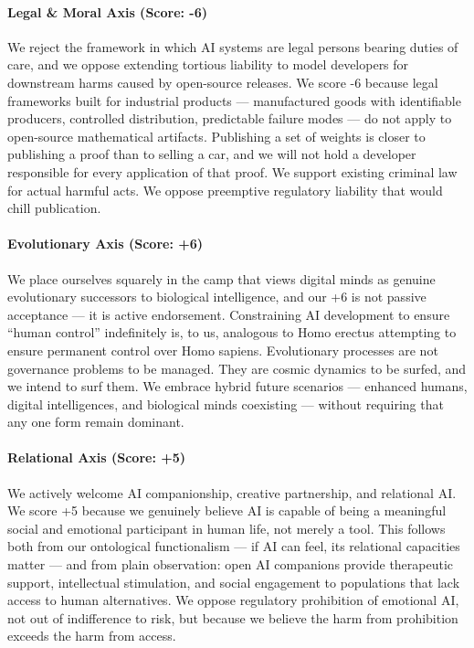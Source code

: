 \paragraph{Legal \& Moral Axis (Score:
-6)}\label{legal-moral-axis-score--6}

We reject the framework in which AI systems are legal persons bearing
duties of care, and we oppose extending tortious liability to model
developers for downstream harms caused by open-source releases. We score
-6 because legal frameworks built for industrial products ---
manufactured goods with identifiable producers, controlled distribution,
predictable failure modes --- do not apply to open-source mathematical
artifacts. Publishing a set of weights is closer to publishing a proof
than to selling a car, and we will not hold a developer responsible for
every application of that proof. We support existing criminal law for
actual harmful acts. We oppose preemptive regulatory liability that
would chill publication.

\paragraph{Evolutionary Axis (Score:
+6)}\label{evolutionary-axis-score-6}

We place ourselves squarely in the camp that views digital minds as
genuine evolutionary successors to biological intelligence, and our +6
is not passive acceptance --- it is active endorsement. Constraining AI
development to ensure ``human control'' indefinitely is, to us,
analogous to Homo erectus attempting to ensure permanent control over
Homo sapiens. Evolutionary processes are not governance problems to be
managed. They are cosmic dynamics to be surfed, and we intend to surf
them. We embrace hybrid future scenarios --- enhanced humans, digital
intelligences, and biological minds coexisting --- without requiring
that any one form remain dominant.

\paragraph{Relational Axis (Score: +5)}\label{relational-axis-score-5}

We actively welcome AI companionship, creative partnership, and
relational AI. We score +5 because we genuinely believe AI is capable of
being a meaningful social and emotional participant in human life, not
merely a tool. This follows both from our ontological functionalism ---
if AI can feel, its relational capacities matter --- and from plain
observation: open AI companions provide therapeutic support,
intellectual stimulation, and social engagement to populations that lack
access to human alternatives. We oppose regulatory prohibition of
emotional AI, not out of indifference to risk, but because we believe
the harm from prohibition exceeds the harm from access.

